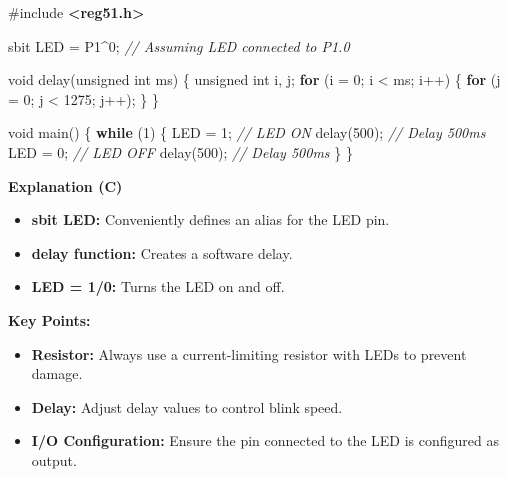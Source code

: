 \documentclass[
]{article}
\newenvironment{Shaded}{}{}
\newcommand{\CommentTok}[1]{\textcolor[rgb]{0.38,0.63,0.69}{\textit{#1}}}
\newcommand{\ControlFlowTok}[1]{\textcolor[rgb]{0.00,0.44,0.13}{\textbf{#1}}}
\newcommand{\DataTypeTok}[1]{\textcolor[rgb]{0.56,0.13,0.00}{#1}}
\newcommand{\DecValTok}[1]{\textcolor[rgb]{0.25,0.63,0.44}{#1}}
\newcommand{\ImportTok}[1]{\textcolor[rgb]{0.00,0.50,0.00}{\textbf{#1}}}
\newcommand{\NormalTok}[1]{#1}
\newcommand{\OperatorTok}[1]{\textcolor[rgb]{0.40,0.40,0.40}{#1}}
\newcommand{\PreprocessorTok}[1]{\textcolor[rgb]{0.74,0.48,0.00}{#1}}
\begin{document}
\begin{Shaded}
\begin{Highlighting}[]
\PreprocessorTok{\#include }\ImportTok{\textless{}reg51.h\textgreater{}}

\NormalTok{sbit LED }\OperatorTok{=}\NormalTok{ P1}\OperatorTok{\^{}}\DecValTok{0}\OperatorTok{;}    \CommentTok{// Assuming LED connected to P1.0}

\DataTypeTok{void}\NormalTok{ delay}\OperatorTok{(}\DataTypeTok{unsigned} \DataTypeTok{int}\NormalTok{ ms}\OperatorTok{)} \OperatorTok{\{}
    \DataTypeTok{unsigned} \DataTypeTok{int}\NormalTok{ i}\OperatorTok{,}\NormalTok{ j}\OperatorTok{;}
    \ControlFlowTok{for} \OperatorTok{(}\NormalTok{i }\OperatorTok{=} \DecValTok{0}\OperatorTok{;}\NormalTok{ i }\OperatorTok{\textless{}}\NormalTok{ ms}\OperatorTok{;}\NormalTok{ i}\OperatorTok{++)} \OperatorTok{\{}
        \ControlFlowTok{for} \OperatorTok{(}\NormalTok{j }\OperatorTok{=} \DecValTok{0}\OperatorTok{;}\NormalTok{ j }\OperatorTok{\textless{}} \DecValTok{1275}\OperatorTok{;}\NormalTok{ j}\OperatorTok{++);}
    \OperatorTok{\}}
\OperatorTok{\}}

\DataTypeTok{void}\NormalTok{ main}\OperatorTok{()} \OperatorTok{\{}
    \ControlFlowTok{while} \OperatorTok{(}\DecValTok{1}\OperatorTok{)} \OperatorTok{\{}
\NormalTok{        LED }\OperatorTok{=} \DecValTok{1}\OperatorTok{;}  \CommentTok{// LED ON}
\NormalTok{        delay}\OperatorTok{(}\DecValTok{500}\OperatorTok{);} \CommentTok{// Delay 500ms}
\NormalTok{        LED }\OperatorTok{=} \DecValTok{0}\OperatorTok{;}  \CommentTok{// LED OFF}
\NormalTok{        delay}\OperatorTok{(}\DecValTok{500}\OperatorTok{);} \CommentTok{// Delay 500ms}
    \OperatorTok{\}}
\OperatorTok{\}}
\end{Highlighting}
\end{Shaded}

\textbf{Explanation (C)}

\begin{itemize}
\item
  \textbf{sbit LED:} Conveniently defines an alias for the LED pin.
\item
  \textbf{delay function:} Creates a software delay.
\item
  \textbf{LED = 1/0:} Turns the LED on and off.
\end{itemize}

\textbf{Key Points:}

\begin{itemize}
\item
  \textbf{Resistor:} Always use a current-limiting resistor with LEDs to
  prevent damage.
\item
  \textbf{Delay:} Adjust delay values to control blink speed.
\item
  \textbf{I/O Configuration:} Ensure the pin connected to the LED is
  configured as output.
\end{itemize}
\end{document}
